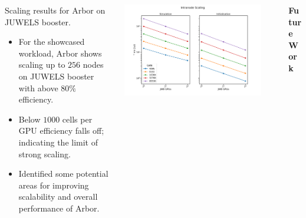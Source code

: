 \documentclass{beamer}
\begin{document}
\begin{frame}[t, fragile]
\begin{columns}[t]
\begin{column}[T]{0.25\textwidth}
      Scaling results for Arbor on JUWELS booster.
      \begin{itemize}
        \item For the showcased workload, Arbor shows scaling up to $256$ nodes on
              JUWELS booster with above $80\%$ efficiency.
        \item Below $1000$ cells per GPU efficiency falls off; indicating the
              limit of strong scaling.
        \item Identified some potential areas for improving scalability and
              overall performance of Arbor.
      \end{itemize}
    \end{column}

    \begin{column}[T]{0.45\textwidth}
      \centering
      \includegraphics[width=0.9\textwidth]{intranode}
    \end{column}
    \begin{column}[T]{0.25\textwidth}
      \textbf{Future Work}


\end{column}
\end{columns}
\end{frame}
\end{document}
